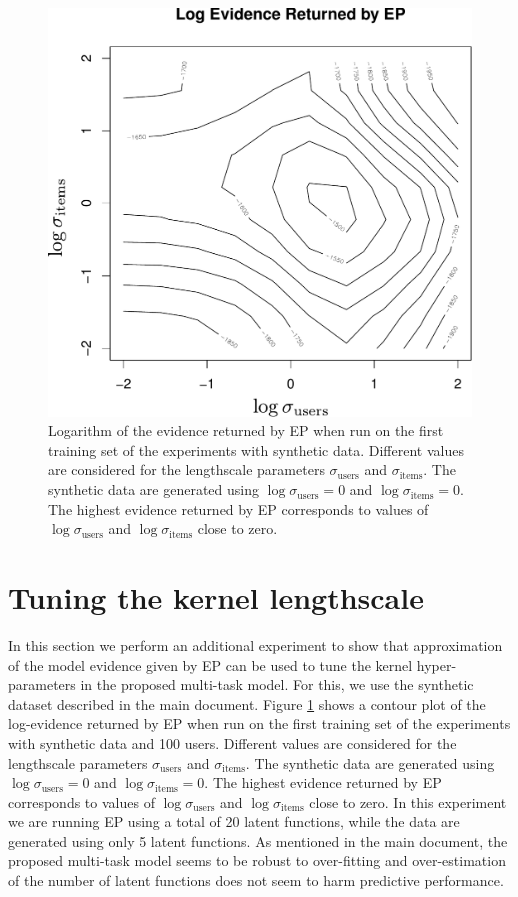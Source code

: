 \documentclass{article}
\begin{document}
\begin{figure}
\centering
\includegraphics[scale=0.4]{figs/plotEvidence.pdf}
\caption{Logarithm of the evidence returned by EP when run on the first training set of the experiments with synthetic data.
Different values are considered for the lengthscale parameters $\sigma_\text{users}$ and $\sigma_\text{items}$.
The synthetic data are generated using $\log \sigma_\text{users} = 0$ and $\log \sigma_\text{items} = 0$.
The highest evidence returned by EP corresponds to values of $\log \sigma_\text{users}$ and
$\log \sigma_\text{items}$ close to zero.}\label{fig:experimentEvidence}
\end{figure}

\section{Tuning the kernel lengthscale}

In this section we perform an additional experiment to show that approximation of the model evidence given by EP can be used to
tune the kernel hyper-parameters in the proposed multi-task model. For this, we use the synthetic dataset
described in the main document. Figure \ref{fig:experimentEvidence} shows a contour plot of the log-evidence returned by EP 
when run on the first training set of the experiments with synthetic data and 100 users.
Different values are considered for the lengthscale parameters $\sigma_\text{users}$ and $\sigma_\text{items}$.
The synthetic data are generated using $\log \sigma_\text{users} = 0$ and $\log \sigma_\text{items} = 0$.
The highest evidence returned by EP corresponds to values of $\log \sigma_\text{users}$ and $\log \sigma_\text{items}$ close to zero.
In this experiment we are running EP using a total of 20 latent functions,
while the data are generated using only 5 latent functions.
As mentioned in the main document, the proposed multi-task model
seems to be robust to over-fitting and over-estimation of
the number of latent functions does not seem to harm predictive performance.
\end{document}
